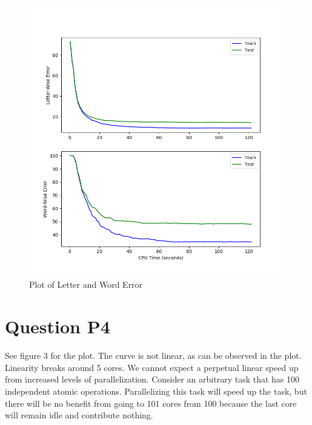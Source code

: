 \documentclass[11pt]{report}
\begin{document}
\begin{figure}[b]
\centering
\includegraphics[scale=0.4]{p3_figure.png}
\caption{Plot of Letter and Word Error}
\end{figure}

\section*{Question P4}
See figure 3 for the plot. The curve is not linear, as can be observed
in the plot. Linearity breaks around 5 cores. We cannot expect a perpetual
linear speed up from increased levels of parallelization. Consider an
arbitrary task that has 100 independent atomic operations. Parallelizing
this task will speed up the task, but there will be no benefit from going
to 101 cores from 100 because the last core will remain idle and contribute
nothing.
\end{document}
